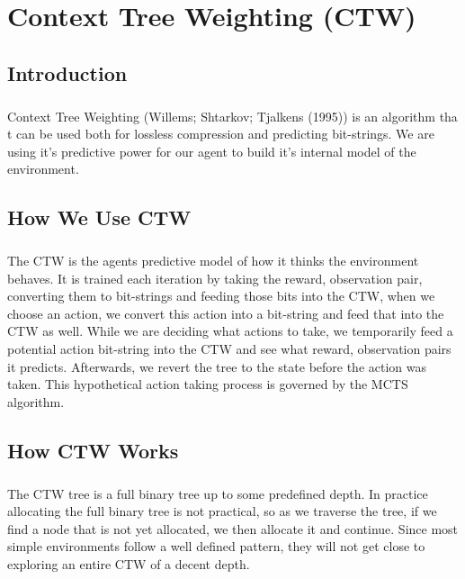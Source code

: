 \documentclass[fancychapters]{report}   	%
\begin{document}
\chapter{Context Tree Weighting (CTW)}
\section{Introduction}
\paragraph{}Context Tree Weighting (Willems; Shtarkov; Tjalkens (1995)) is an algorithm tha t can be used both for lossless compression and predicting bit-strings. We are using it's predictive power for our agent to build it's internal model of the environment.

\section{How We Use CTW}
\paragraph{}The CTW is the agents predictive model of how it thinks the environment behaves. It is trained each iteration by taking the reward, observation pair, converting them to bit-strings and feeding those bits into the CTW, when we choose an action, we convert this action into a bit-string and feed that into the CTW as well. While we are deciding what actions to take, we temporarily feed a potential action bit-string into the CTW and see what reward, observation pairs it predicts.  Afterwards, we revert the tree to the state before the action was taken. This hypothetical action taking process is governed by the MCTS algorithm.

\section{How CTW Works}
\paragraph{}The CTW tree is a full binary tree up to some predefined depth. In practice allocating the full binary tree is not practical, so as we traverse the tree, if we find a node that is not yet allocated, we then allocate it and continue. Since most simple environments follow a well defined pattern, they will not get close to exploring an entire CTW of a decent depth.
\end{document}

